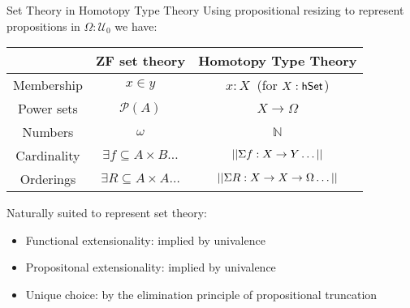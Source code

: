 \documentclass[xcolor=dvipsnames,compress,aspectratio=169,handout]{beamer}
\newcommand{\MBB}[1]{\ensuremath{\mathbb{#1}}\xspace}  %
\newcommand{\MCL}[1]{\ensuremath{\mathcal{#1}}\xspace} %
\newcommand{\Nat}{\MBB{N}}   %
\newcommand{\Pow}{\MCL P}
\newcommand{\Prop}{\MBB P}
\begin{document}
\begin{frame}{Set Theory in Homotopy Type Theory}
	\vspace{0.2cm}
	Using propositional resizing to represent propositions in $\Omega:\mathcal{U}_0$ we have:

	\vspace{0.2cm}
	\begin{center}
	\begin{tabular}{c|c|c}
				&ZF set theory&Homotopy Type Theory\\\hline
				\vphantom{\vdots}Membership&$x\in y$&$x:X~$ (for $X:\mathsf{hSet}$)\\[0.2cm]
				Power sets&$\Pow(A)$&$X\to\Omega$\\[0.2cm]
				Numbers&$\omega$&$\Nat$\\[0.2cm]
				Cardinality&$\exists f\subseteq A\times B\dots$&$||\Sigma f:X\to Y\dots||$\\[0.2cm]
				Orderings&$\exists R\subseteq A\times A\dots$&$||\Sigma R:X\to X\to\Omega\dots||$
	\end{tabular}
	\end{center}
	
	\pause
	\vspace{0.2cm}
	Naturally suited to represent set theory:
	\begin{itemize}
	\item Functional extensionality: implied by univalence
	\item Propositonal extensionality: implied by univalence
	\item Unique choice: by the elimination principle of propositional truncation
	\end{itemize}
	
\end{frame}
\end{document}
